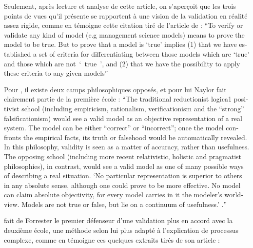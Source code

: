 Seulement, après lecture et analyse de cette article, on s'aperçoit que les trois points de vues qu'il présente se rapportent à une vision de la validation en réalité assez rigide, comme en témoigne cette citation tiré de l'article de \textcite{Naylor1967} : \foreignquote{english}{To verify or validate any kind of model (e.g management science models) means to prove the model to be true. But to prove that a model is \enquote{true} implies (1) that we have established a set of criteria for differentiating between those models which are \enquote{true} and those which are not \enquote{ true }, and (2) that we have the possibility to apply these criteria to any given models}

Pour \textcite{Barlas1990, Barlas1996}, il existe deux camps philosophiques opposés, et pour lui Naylor fait clairement partie de la première école : \foreignquote{english}{The traditional reductionist logica1 positivist school (including empiricism, rationalism, verificationism and the “strong” falsificationism) would see a valid model as an objective representation of a real system. The model can be either “correct” or “incorrect”; once the model confronts the empirical facts, its truth or falsehood would be automatically revealed. In this philosophy, validity is seen as a matter of accuracy, rather than usefulness. The opposing school (including more recent relativistic, holistic and pragmatist philosophies), in contrast, would see a valid model as one of many possible ways of describing a real situation. \enquote{No particular representation is superior to others in any absolute sense, although one could prove to be more effective. No model can claim absolute objectivity, for every model carries in it the modeler’s worldview. Models are not true or false, but lie on a continuum of usefulness.} \autocite{Barlas1990}.}

\textcite{Barlas1990} fait de Forrester le premier défenseur d'une validation plus en accord avec la deuxième école, une méthode selon lui plus adapté à l'explication de processus complexe, comme en témoigne ces quelques extraits tirés de son article :


